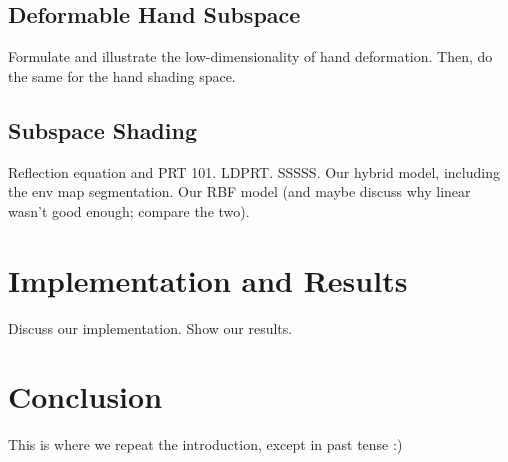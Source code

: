\documentclass[review]{acmsiggraph}
\begin{document}
\subsection{Deformable Hand Subspace}
\label{sec:subspace}

Formulate and illustrate the low-dimensionality of hand deformation. Then, do the same for the hand shading space.

\subsection{Subspace Shading}
\label{sec:model}

Reflection equation and PRT 101. LDPRT. SSSSS. Our hybrid model, including the env map segmentation. Our RBF model (and maybe discuss why linear wasn't good enough; compare the two).

\section{Implementation and Results}
\label{sec:results}

Discuss our implementation. Show our results.

\section{Conclusion}
\label{sec:conclusion}

This is where we repeat the introduction, except in past tense :)

\end{document}
